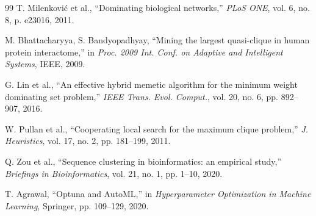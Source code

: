 \documentclass[runningheads]{llncs}
\begin{document}
\begin{thebibliography}{99}
		T. Milenković et al.,
		``Dominating biological networks,''
		\textit{PLoS ONE}, vol. 6, no. 8, p. e23016, 2011.
		
		M. Bhattacharyya, S. Bandyopadhyay,
		``Mining the largest quasi-clique in human protein interactome,''
		in \textit{Proc. 2009 Int. Conf. on Adaptive and Intelligent Systems}, IEEE, 2009.
		
		G. Lin et al.,
		``An effective hybrid memetic algorithm for the minimum weight dominating set problem,''
		\textit{IEEE Trans. Evol. Comput.}, vol. 20, no. 6, pp. 892--907, 2016.
		
		W. Pullan et al.,
		``Cooperating local search for the maximum clique problem,''
		\textit{J. Heuristics}, vol. 17, no. 2, pp. 181--199, 2011.
		
		Q. Zou et al.,
		``Sequence clustering in bioinformatics: an empirical study,''
		\textit{Briefings in Bioinformatics}, vol. 21, no. 1, pp. 1--10, 2020.
		
		T. Agrawal,
		``Optuna and AutoML,''
		in \textit{Hyperparameter Optimization in Machine Learning}, Springer, pp. 109--129, 2020.
		
	\end{thebibliography}
	
\end{document}
